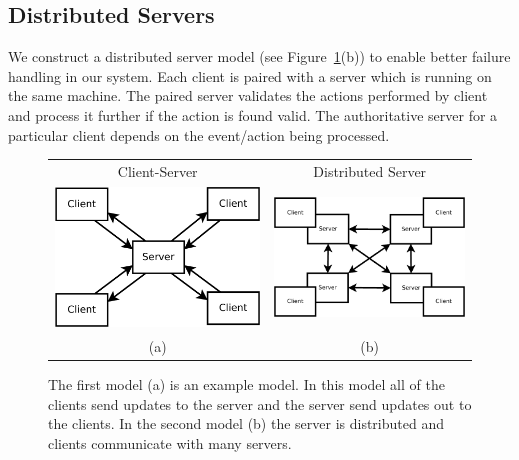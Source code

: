 \subsection{Distributed Servers}
\label{subsec:distributed-servers}

	We construct a distributed server model (see Figure~\ref{figure:server-models}(b)) to enable better failure handling in our system. Each client is paired with a server which is running on the same machine. The paired server validates the actions performed by client and process it further if the action is found valid. The authoritative server for a particular client depends on the event/action being processed. 
	
	\begin{figure}[ht]
	\centering
	\begin{tabular}{c c}
		Client-Server & Distributed Server \\
		\includegraphics[width=0.44\linewidth]{../images/client-server-model-crop.pdf} &
		\includegraphics[width=0.48\linewidth]{../images/client-distributed-server-model-crop.pdf} \\
		(a) & (b)
	\end{tabular}

	\caption{\label{figure:server-models} The first model (a) is an example \clientServer model. In this model all of the clients send updates to the server and the server send updates out to the clients. In the second model (b) the server is distributed and clients communicate with many servers.}
	\end{figure}
	
